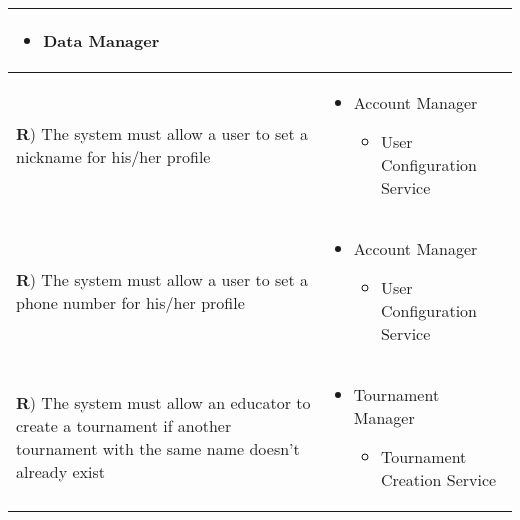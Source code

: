 \documentclass[../DD.tex]{subfiles}
\newcounter{rown}
\newcommand{\rowIndex}{\arabic{rown}\stepcounter{rown}}
\begin{document}
\begin{table}[h!]
\begin{center}
\begin{tabular}{|m{20em}|m{20em}|}
\begin{itemize}
                \item Data Manager
            \end{itemize}\\
            \hline
            \textbf{R\rowIndex}) The system must allow a user to set a nickname for his/her profile & \begin{itemize}
                \item Account Manager
                \begin{itemize}
                    \item User Configuration Service
                \end{itemize}
            \end{itemize}\\
            \hline
            \textbf{R\rowIndex}) The system must allow a user to set a phone number for his/her profile & \begin{itemize}
                \item Account Manager
                \begin{itemize}
                    \item User Configuration Service
                \end{itemize}
            \end{itemize}\\
            \hline
            \textbf{R\rowIndex}) The system must allow an educator to create a tournament if another tournament with the same name doesn't already exist & \begin{itemize}
                \item Tournament Manager
                \begin{itemize}
                    \item Tournament Creation Service
                \end{itemize}
            \end{itemize}\\
            \hline
            \end{tabular}
        \end{center}
    \end{table}
    \newpage
\end{document}
